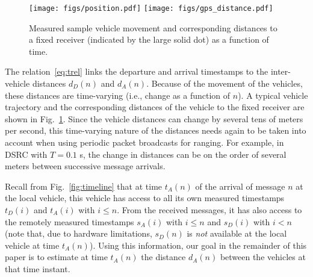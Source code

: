 \documentclass[12pt,journal,final,onecolumn]{IEEEtran}
\theoremstyle{definition}
\theoremstyle{myremark}
\begin{document}
\begin{figure}[htbp]
    \centering 
    \texttt{[image: figs/position.pdf]} 
    \texttt{[image: figs/gps\_distance.pdf]} 

    \caption{Measured sample vehicle movement and corresponding distances to a
        fixed receiver (indicated by the large solid dot) as a function of time.}
    \label{fig:movement}
\end{figure}

The relation~\eqref{eq:trel} links the departure and arrival timestamps to the
inter-vehicle distances $d_D(n)$ and $d_A(n)$. Because of the movement of the
vehicles, these distances are time-varying (i.e., change as a function of $n$).
A typical vehicle trajectory and the corresponding distances of the vehicle to the fixed receiver are shown in
Fig.~\ref{fig:movement}. Since the vehicle distances can change by several tens
of meters per second, this time-varying nature of the distances needs again to
be taken into account when using periodic packet broadcasts for ranging. For example, in DSRC
with $T = 0.1$ s, the change in distances can be on the order of several meters
between successive message arrivals.

Recall from Fig.~\ref{fig:timeline} that at time $t_A(n)$ of the arrival of
message $n$ at the local vehicle, this vehicle has access to all its own
measured timestamps $t_D(i)$ and $t_A(i)$ with $i \leq n$. From the received
messages, it has also access to the remotely measured timestamps $s_A(i)$ with
$i\leq n$ and $s_D(i)$ with $i < n$ (note that, due to hardware limitations,
$s_D(n)$ is \emph{not} available at the local vehicle at time $t_A(n)$).  Using
this information, our goal in the remainder of this paper is to estimate at time
$t_A(n)$ the distance $d_A(n)$ between the vehicles at that time instant.
\end{document}
